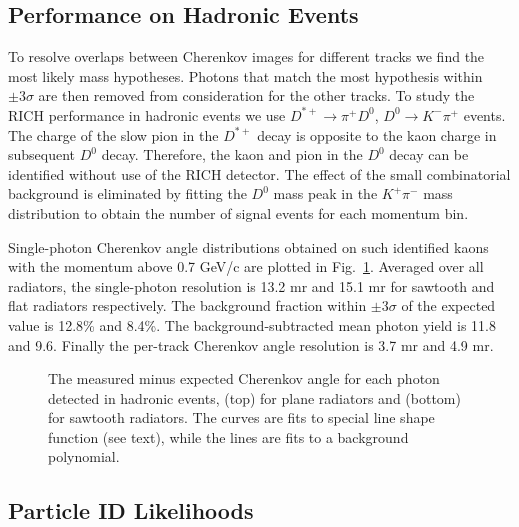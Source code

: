 \documentclass[fleqn,twoside]{article}
\begin{document}
\subsection{Performance on Hadronic Events}

To resolve overlaps between Cherenkov images for different tracks
we find the most likely mass hypotheses. Photons that match the
most hypothesis within $\pm3\sigma$ are then removed from
consideration for the other tracks. To study the RICH performance
in hadronic events we use  $D^{*+}\to\pi^+ D^0$, $D^0\to K^-\pi^+$
events. The charge of the slow pion in the $D^{*+}$ decay is
opposite to the kaon charge in subsequent $D^0$ decay. Therefore,
the kaon and pion in the $D^0$ decay can be identified without use
of the RICH detector. The effect of the small combinatorial
background is eliminated by fitting the $D^0$ mass peak in the
$K^+\pi^-$ mass distribution to obtain the number of signal events
for each momentum bin.

Single-photon Cherenkov angle distributions
obtained on such identified
kaons with the momentum above 0.7 GeV/c are plotted
in Fig.~\ref{single_photon_hadrons}.
Averaged over all radiators, the single-photon resolution is
13.2 mr and 15.1 mr for sawtooth and flat radiators
respectively.
The background fraction within $\pm3\sigma$ of the
expected value is 12.8\% and 8.4\%.
The background-subtracted mean photon yield is 11.8 and 9.6.
Finally the per-track Cherenkov angle resolution is
3.7 mr and 4.9 mr.

\begin{figure} [htb]
\centerline{\hspace{.5in}\epsfxsize
1.5in}
\centerline{\hspace{.4in}\epsfxsize
1.6in}
\vspace{-.7cm} \caption{\label{single_photon_hadrons} The measured
minus expected
      Cherenkov angle for each photon detected in hadronic events,
      (top) for plane radiators and (bottom) for sawtooth radiators.
      The curves are fits to special line shape function (see text),
      while the lines are fits to a background polynomial.}
\vspace{-0.7cm}\end{figure}

\subsection{Particle ID Likelihoods}
\end{document}

